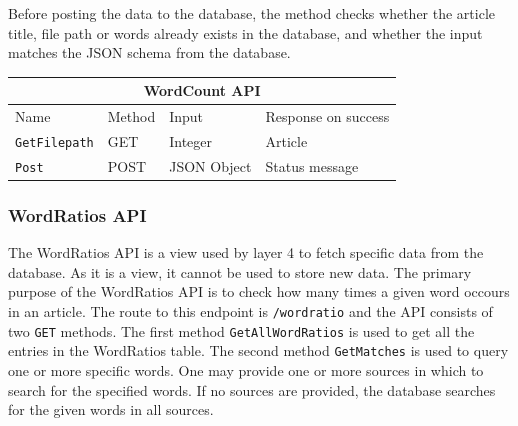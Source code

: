 Before posting the data to the database, the method checks whether the article title, file path or words already exists in the database, and whether the input matches the JSON schema from the database.

\begin{table}[]
\begin{tabular}{|llll|}
\hline
\multicolumn{4}{|c|}{\textbf{WordCount API}}                                                                                 \\ \hline
\multicolumn{1}{|l|}{Name}                 & \multicolumn{1}{l|}{Method} & \multicolumn{1}{l|}{Input}       & Response on success       \\ \hline
\multicolumn{1}{|l|}{\texttt{GetFilepath}} & \multicolumn{1}{l|}{GET}    & \multicolumn{1}{l|}{Integer}     & Article        \\ \hline
\multicolumn{1}{|l|}{\texttt{Post}}        & \multicolumn{1}{l|}{POST}   & \multicolumn{1}{l|}{JSON Object} & Status message \\ \hline
\end{tabular}
\end{table}


\subsubsection{WordRatios API}
The WordRatios API is a view used by layer 4 to fetch specific data from the database.
As it is a view, it cannot be used to store new data. 
The primary purpose of the WordRatios API is to check how many times a given word occours in an article.
The route to this endpoint is \texttt{/wordratio} and the API consists of two \texttt{GET} methods. 
The first method \texttt{GetAllWordRatios} is used to get all the entries in the WordRatios table.
The second method \texttt{GetMatches} is used to query one or more specific words. 
One may provide one or more sources in which to search for the specified words.
If no sources are provided, the database searches for the given words in all sources.


